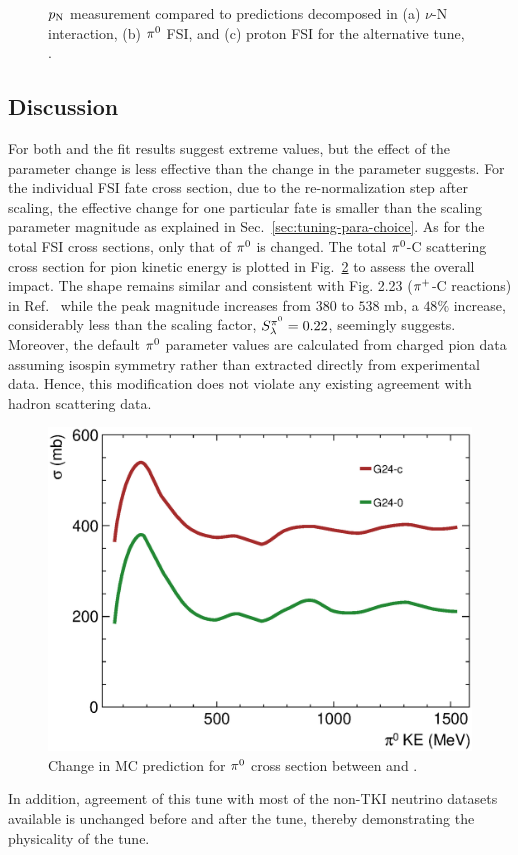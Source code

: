\begin{figure}[!htb]
    \caption{\label{fig:minpiz-alttune} \minpiz $p_\textrm{N}$ measurement compared to \genie predictions decomposed in  (a) $\nu$-N interaction, (b) $\pi^0$ FSI, and (c) proton FSI for the alternative tune, \gT.} 
\end{figure}


\subsection{Discussion}
For both \gC and \gT the fit results suggest extreme values, but the effect of the parameter change is less effective than the change in the parameter suggests. 
For the individual FSI fate cross section, due to the re-normalization step after scaling, the effective change for one particular fate is smaller than the scaling parameter magnitude as explained in Sec.~\ref{sec:tuning-para-choice}. 
As for the total FSI cross sections, only that of $\pi^0$ is changed. The total $\pi^0$-C scattering cross section for pion kinetic energy is plotted in Fig.~\ref{fig:pizmfp_change} to assess the overall impact. 
The shape remains similar and consistent with Fig. 2.23 ($\pi^+$-C reactions) in Ref.~\cite{Andreopoulos:2015wxa} while the peak magnitude increases from $380$ to $538$ mb, a $48\%$ increase, considerably less than the scaling factor, $S_\lambda^{\pi^{0}}=0.22$, seemingly suggests. 
Moreover, the default $\pi^0$ parameter values are calculated from charged pion data assuming isospin symmetry rather than extracted directly from experimental data. 
Hence, this modification does not violate any existing agreement with hadron scattering data.
\begin{figure}[!htb] 	
    \centering 		
    \includegraphics[width=\dbfigwid\textwidth]{figures/pi0mfp_change.eps}
    \caption{\label{fig:pizmfp_change} Change in MC prediction for $\pi^0$ cross section between \gZero and \gC . } 
\end{figure}
In addition, agreement of this tune with most of the non-TKI neutrino datasets available is unchanged before and after the tune,  thereby demonstrating the physicality of the tune.

